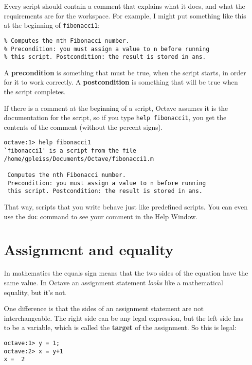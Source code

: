 Every script should contain a comment that explains
what it does, and what the requirements are for the workspace. For
example, I might put something like this at the beginning of
{\tt fibonacci1}:

\begin{verbatim}
% Computes the nth Fibonacci number. 
% Precondition: you must assign a value to n before running 
% this script. Postcondition: the result is stored in ans.
\end{verbatim}

A {\bf precondition} is something that must be true, when the script
starts, in order for it to work correctly. A {\bf postcondition}
is something that will be true when the script completes.

If there is a comment at the beginning of a script, Octave assumes
it is the documentation for the script, so if you type {\tt help
fibonacci1}, you get the contents of the comment (without the percent
signs).

\begin{verbatim}
octave:1> help fibonacci1
`fibonacci1' is a script from the file
/home/gpleiss/Documents/Octave/fibonacci1.m

 Computes the nth Fibonacci number. 
 Precondition: you must assign a value to n before running 
 this script. Postcondition: the result is stored in ans.
\end{verbatim}

That way, scripts that you write behave just like predefined scripts.
You can even use the {\tt doc} command to see your comment in the
Help Window.

\section{Assignment and equality}

In mathematics the equals sign means that the two sides of the
equation have the same value. In Octave an assignment statement
{\em looks} like a mathematical equality, but it's not.

One difference is that the sides of an assignment statement are not
interchangeable. The right side can be any legal expression, but
the left side has to be a variable, which is called the {\bf
target} of the assignment. So this is legal:

\begin{verbatim}
octave:1> y = 1;
octave:2> x = y+1
x =  2
\end{verbatim}

